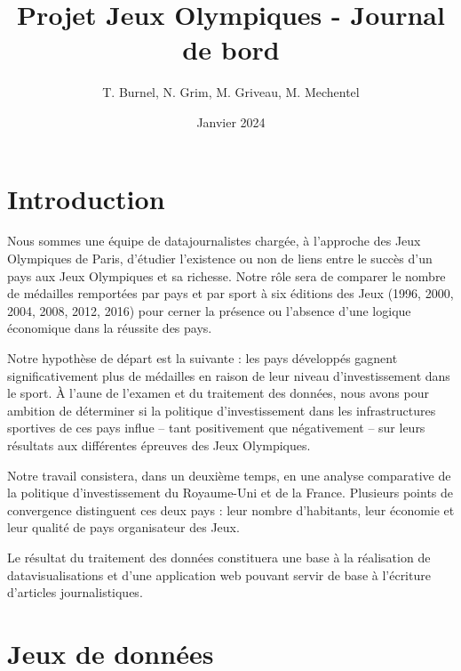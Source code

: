 \documentclass[hidelinks, 12pt]{article}
\title{Projet Jeux Olympiques - Journal de bord}
\date{Janvier 2024}
\author{T. Burnel, N. Grim, M. Griveau, M. Mechentel}
\begin{document}
\maketitle

\section{Introduction}

Nous sommes une équipe de datajournalistes chargée, à l'approche des Jeux Olympiques de Paris, d'étudier l'existence ou non de liens entre le succès d'un pays aux Jeux Olympiques et sa richesse. Notre rôle sera de comparer le nombre de médailles remportées par pays et par sport à six éditions des Jeux (1996, 2000, 2004, 2008, 2012, 2016) pour cerner la présence ou l'absence d'une logique économique dans la réussite des pays.

Notre hypothèse de départ est la suivante : les pays développés gagnent significativement plus de médailles en raison de leur niveau d'investissement dans le sport. À l’aune de l’examen et du traitement des données, nous avons pour ambition de déterminer si la politique d’investissement dans les infrastructures sportives de ces pays influe -- tant positivement que négativement -- sur leurs résultats aux différentes épreuves des Jeux Olympiques.

Notre travail consistera, dans un deuxième temps, en une analyse comparative de la politique d'investissement du Royaume-Uni et de la France. Plusieurs points de convergence distinguent ces deux pays : leur nombre d'habitants, leur économie et leur qualité de pays organisateur des Jeux.
	
Le résultat du traitement des données constituera une base à la réalisation de datavisualisations et d'une application web pouvant servir de base à l'écriture d'articles journalistiques.





















\section{Jeux de données}
\end{document}
